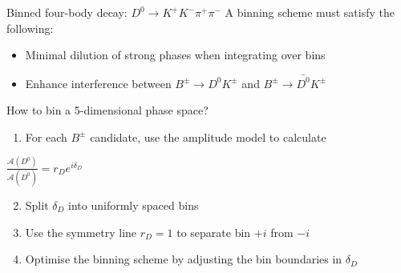 \documentclass[dvipsnames]{beamer}
\begin{document}
\begin{frame}{Binned four-body decay: $D^0\to K^+K^-\pi^+\pi^-$}
  \vspace{0.0cm}
  {\Large A binning scheme must satisfy the following:}
  \begin{itemize}
    \item{Minimal dilution of strong phases when integrating over bins}
    \item{Enhance interference between $B^\pm\to D^0K^\pm$ and $B^\pm\to\bar{D^0}K^\pm$}
  \end{itemize}
  \vspace{0.4cm}
  {\Large How to bin a 5-dimensional phase space?}
  \begin{enumerate}
    \item{For each $B^\pm$ candidate, use the amplitude model to calculate}
  \end{enumerate}
  \begin{center}
    {\Large $\frac{\mathcal{A}(D^0)}{\mathcal{A}(\bar{D^0})} = r_De^{i\delta_D}$}
  \end{center}
  \begin{enumerate}
    \setcounter{enumi}{1}
    \setlength\itemsep{0.5em}
    \item{Split $\delta_D$ into uniformly spaced bins}
    \item{Use the symmetry line $r_D = 1$ to separate bin $+i$ from $-i$}
    \item{Optimise the binning scheme by adjusting the bin boundaries in $\delta_D$}
  \end{enumerate}
\end{frame}
\end{document}
